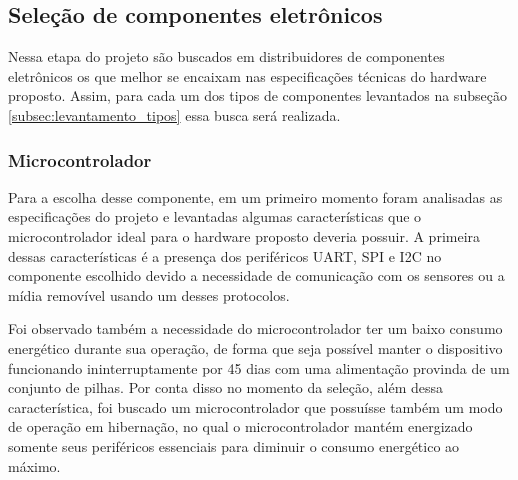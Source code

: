 \subsection{Seleção de componentes eletrônicos}

Nessa etapa do projeto são buscados em distribuidores de componentes eletrônicos os que melhor se encaixam nas especificações técnicas do hardware proposto. Assim, para cada um dos tipos de componentes levantados na subseção \ref{subsec:levantamento_tipos} essa busca será realizada. 



\subsubsection{Microcontrolador}\label{subsubsec:esp32_modulo}


Para a escolha desse componente, em um primeiro momento foram analisadas as especificações do projeto e levantadas algumas características que o microcontrolador ideal para o hardware proposto deveria possuir. A primeira dessas características é a presença dos periféricos \gls{UART}, \gls{SPI} e \gls{I2C} no componente escolhido devido a necessidade de comunicação com os sensores ou a mídia removível usando um desses protocolos.

Foi observado também a necessidade do microcontrolador ter um baixo consumo energético durante sua operação, de forma que seja possível manter o dispositivo funcionando ininterruptamente por 45 dias com uma alimentação provinda de um conjunto de pilhas. Por conta disso no momento da seleção, além dessa característica, foi buscado um microcontrolador que possuísse também um modo de operação em hibernação, no qual o microcontrolador mantém energizado somente seus periféricos essenciais para diminuir o consumo energético ao máximo. 

